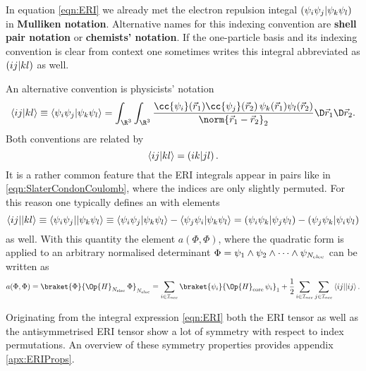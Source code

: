 \begin{rem}
	\label{rem:ERI}
	In equation \eqref{eqn:ERI} we already met
	the electron repulsion integal $\left( \psi_i \psi_j \middle| \psi_k \psi_l \right)$
	in \textbf{Mulliken notation}.
	Alternative names for this indexing convention are
	\textbf{shell pair notation} or \textbf{chemists' notation}.
	If the one-particle basis and its indexing convention is clear
	from context one sometimes writes this integral
	abbreviated as $\left( ij \middle| kl \right)$ as well.

	\noindent
	An alternative convention is physicists' notation
	\[
		\eriPh{i j}{k l} \equiv
		\eriPh{\psi_i \psi_j}{\psi_k \psi_l}
		= \int_{\R^3} \int_{\R^3}
				\frac{\cc{\psi_i}(\vec{r}_1) \cc{\psi_j}(\vec{r}_2)
				\, \psi_k(\vec{r}_1) \psi_l(\vec{r}_2)}
				{\norm{\vec{r}_1 - \vec{r}_2}_2}
				\D \vec{r}_1 \D \vec{r}_2.
	\]
	Both conventions are related by
	\begin{equation}
		\left\langle i j \middle| k l \right\rangle = \left( i k \middle| j l \right).
		\label{eqn:EriMulPhys}
	\end{equation}
	It is a rather common feature that the ERI integrals appear in pairs
	like in \eqref{eqn:SlaterCondonCoulomb},
	where the indices are only slightly permuted.
	For this reason one typically defines an
	with elements
	\[ \left\langle ij \middle|\middle| kl \right\rangle \equiv
		\left\langle \psi_i \psi_j \middle|\middle| \psi_k \psi_l \right\rangle
		\equiv \left\langle \psi_i \psi_j \middle| \psi_k \psi_l \right\rangle
		- \left\langle \psi_j \psi_i \middle| \psi_k \psi_l \right\rangle
		= \left( \psi_i\psi_k \middle| \psi_j\psi_l \right) - \left( \psi_j\psi_k \middle| \psi_i\psi_l \right)
	\]
	as well. With this quantity the element $a(\Phi, \Phi)$,
	where the quadratic form is applied to an arbitrary normalised
	determinant $\Phi = \psi_1 \wedge \psi_2 \wedge \cdots \wedge \psi_{N_\text{elec}}$
	can be written as
	\begin{equation}
		a(\Phi, \Phi) = \braket{\Phi}{\Op{H}_{\Nelec} \, \Phi}_{\Nelec}
		= \sum_{i\in\Iocc} \braket{\psi_i}{\Op{H}_\text{core}\, \psi_i}_1
			+ \frac12 \sum_{i\in\Iocc} \sum_{j\in\Iocc} \eriAsym{ij}{ij}.
		\label{eqn:EnergySlaterDeterminant}
	\end{equation}

	Originating from the integral expression \eqref{eqn:ERI}
	both the ERI tensor as well as the antisymmetrised ERI tensor
	show a lot of symmetry with respect to index permutations.
	An overview of these symmetry properties provides appendix \vref{apx:ERIProps}.
\end{rem}
